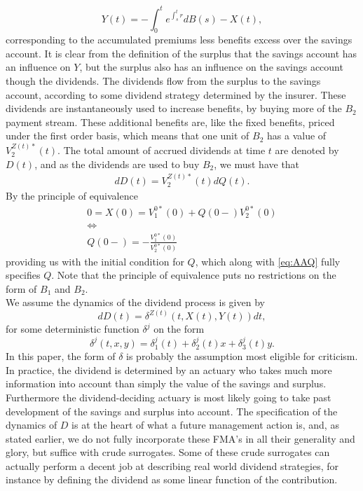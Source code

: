 \documentclass[12pt]{article}
\theoremstyle{my_thm}
\begin{document}
$$
Y(t)= - \int_0^t e^{\int_s^t r} dB(s)-X(t),
$$
corresponding to the accumulated premiums less benefits excess over the savings account. It is clear from the definition of the surplus that the savings account has an influence on $Y$, but the surplus also has an influence on the savings account though the dividends. The dividends flow from the surplus to the savings account, according to some dividend strategy determined by the insurer. These dividends are instantaneously used to increase benefits, by buying more of the $B_2$ payment stream. These additional benefits are, like the fixed benefits, priced under the first order basis, which means that one unit of $B_2$ has a value of $V_2^{Z(t)*}(t)$. The total amount of accrued dividends at time $t$ are denoted by $D(t)$, and as the dividends are used to buy $B_2$, we must have that
\begin{align}
dD(t)=V_2^{Z(t)*}(t)dQ(t). \label{eq:AAQ}
\end{align}
By the principle of equivalence
\begin{gather*}
0=X(0)=V_1^{0*}(0)+Q(0-)V_2^{0*}(0)
\\
\Leftrightarrow
\\
Q(0-)=-\frac{V_1^{0*}(0)}{V_2^{0*}(0)}
\end{gather*}
providing us with the initial condition for $Q$, which along with \eqref{eq:AAQ} fully specifies $Q$. Note that the principle of equivalence puts no restrictions on the form of $B_1$ and $B_2$.
\\[12pt]
We assume the dynamics of the dividend process is given by
$$
dD(t)=\delta^{Z(t)}(t,X(t),Y(t)) dt,
$$
for some deterministic function $\delta^j$ on the form
\begin{equation*}
\delta^j(t,x,y)=\delta_1^j(t)+\delta_2^j(t)x+\delta_3^j(t)y.
\end{equation*}
In this paper, the form of $\delta$ is probably the assumption most eligible for criticism. In practice, the dividend is determined by an actuary who takes much more information into account than simply the value of the savings and surplus. Furthermore the dividend-deciding actuary is most likely going to take past development of the savings and surplus into account. The specification of the dynamics of $D$ is at the heart of what a future management action is, and, as stated earlier, we do not fully incorporate these FMA's in all their generality and glory, but suffice with crude surrogates. Some of these crude surrogates can actually perform a decent job at describing real world dividend strategies, for instance by defining the dividend as some linear function of the contribution.
\end{document}
